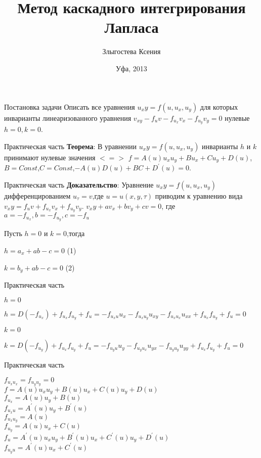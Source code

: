 \documentclass{beamer}
\begin{document}
\title{Метод каскадного интегрирования Лапласа}  
\author{Злыгостева Ксения}
\date{Уфа, 2013} 
\frame{\titlepage} 
\begin{frame}{Постановка задачи}
Описать все уравнения $u_xy=f(u,u_x,u_y)$ для которых инварианты линеаризованного уравнения $v_{xy}-f_uv-f_{u_x}v_x-f_{u_y}v_y=0$ нулевые $h=0,k=0$.
\end{frame}



\begin{frame}{Практическая часть}
\textbf{Теорема}: В уравнении  $u_xy=f(u,u_x,u_y)$ инварианты $h$ и $k$ принимают нулевые значения  $<=>$  $f=A(u)u_xu_y+Bu_x+Cu_y+D(u)$, 
$B=Const$,$C=Const$,$-A(u)D(u)+BC+D^{'}(u)=0$.

\end{frame}



\begin{frame}{Практическая часть}
\textbf{Доказательство}: Уравнение $u_xy=f(u,u_x,u_y)$ дифференцированием $u_\tau=v$,где $u=u(x,y,\tau)$ приводим к уравнению вида $v_xy=f_uv+f_{u_x}v_x+f_{u_y}v_y$.
$v_xy+av_x+bv_y+cv=0$, где $a=-f_{u_x},b=-f_{u_y},c=-f_u$
\centerline {Пусть $h=0$ и $k=0$,тогда}
\centerline{$h = a_x + ab - c=0$      (1)}
\centerline{$k = b_y + ab - c=0$      (2)}


\end{frame}

\begin{frame}{Практическая часть}
\centerline{$h=0$}
\centerline{ $h=D(-f_{u_x})+f_{u_x} f_{u_y}+f_u=-f_{u_x u} u_x-f_{u_x u_y } u_{xy}- f_{u_x u_x } u_{xx}+f_{u_x} f_{u_y }+f_u=0 $}                 
\centerline{$k=0$}
\centerline{ $k=D(-f_{u_y} )+f_{u_x} f_{u_y}+f_u=-f_{u_y u} u_y-f_{u_y u_x} u_{yx}- f_{u_y u_y } u_{yy}+f_{u_x} f_{u_y}+f_u=0$}
\end{frame}

\begin{frame}{Практическая часть}

$f_{u_x u_x }=f_{u_y u_y }=0 $    \\
$f=A(u) u_x u_y+B(u) u_x+C(u) u_y+D(u)$\\
$f_{u_x }=A(u) u_y+B(u)$\\
$f_{u_x u}=A^{'} (u) u_y+B^{'}  (u)$\\
$f_{u_x u_y}=A(u)$\\
$f_{u_y }=A(u) u_x+C(u)$\\
$f_u=A^{'}  (u) u_x u_y+B^{'}  (u) u_x+C^{'}  (u) u_y+D^{'}  (u)$\\
$f_{u_y u}=A^{'}  (u) u_x+C^{'}  (u)$\\

\end{frame}
\end{document}
